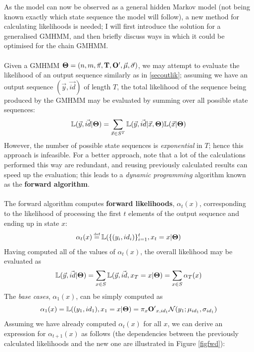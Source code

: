 \documentclass[12pt,a4paper,twoside,openright]{report}
\newcommand\myeq{\stackrel{\mathclap{\tiny\mbox{def}}}{=}}
\begin{document}
As the model can now be observed as a general hidden Markov model (not being known exactly which state sequence the model will follow), a new method for calculating likelihoods is needed; I will first introduce the solution for a generalised GMHMM, and then briefly discuss ways in which it could be optimised for the chain GMHMM.\\ \\
Given a GMHMM ${\bf \Theta} = (n, m, \vec{\pi}, {\bf T}, {\bf O'}, \vec{\mu}, \vec{\sigma})$, we may attempt to evaluate the likelihood of an output sequence similarly as in \cref{secoutlik}; assuming we have an output sequence $(\vec{y}, \vec{id})$ of length $T$, the total likelihood of the sequence being produced by the GMHMM may be evaluated by summing over all possible state sequences:
\[\mathbb{L}(\vec{y}, \vec{id}|{\bf \Theta}) = \sum_{\vec{x} \in S^T}\mathbb{L}(\vec{y}, \vec{id}|\vec{x}, {\bf \Theta})\mathbb{L}(\vec{x}|{\bf \Theta})\]
However, the number of possible state sequences is \emph{exponential} in $T$; hence this approach is infeasible. For a better approach, note that a lot of the calculations performed this way are redundant, and reusing previously calculated results can speed up the evaluation; this leads to a \emph{dynamic programming} algorithm known as the {\bf forward algorithm}.\\ \\
The forward algorithm computes \textbf{forward likelihoods}, $\alpha_t(x)$, corresponding to the likelihood of processing the first $t$ elements of the output sequence and ending up in state $x$:
\[\alpha_t(x) \myeq \mathbb{L}(\{(y_i, id_i)\}_{i=1}^t, x_t = x|{\bf \Theta})\]
Having computed all of the values of $\alpha_t(x)$, the overall likelihood may be evaluated as
\[\mathbb{L}(\vec{y}, \vec{id}|{\bf \Theta}) = \sum_{x \in S}\mathbb{L}(\vec{y}, \vec{id}, x_T = x|{\bf \Theta}) = \sum_{x \in S}\alpha_T(x)\]
The \emph{base cases}, $\alpha_1(x)$, can be simply computed as
\[\alpha_1(x) = \mathbb{L}((y_1, id_1), x_1 = x|{\bf \Theta}) = \pi_x{\bf O'}_{x,id_1}\mathcal{N}(y_1; \mu_{id_1}, \sigma_{id_1})\]
Assuming we have already computed $\alpha_t(x)$ for all $x$, we can derive an expression for $\alpha_{t+1}(x)$ as follows (the dependencies between the previously calculated likelihoods and the new one are illustrated in Figure \ref{figfwd}):
\end{document}

